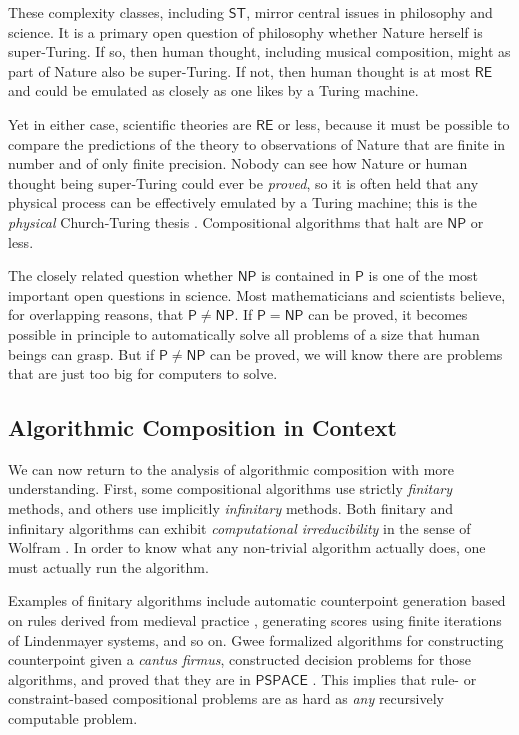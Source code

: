 \documentclass[11pt,papersize=a4]{scrartcl}
\begin{document}
\noindent These complexity classes, including $\mathsf{ST}$, mirror central issues in philosophy and science. It is a primary open question of philosophy whether Nature herself is super-Turing. If so, then human thought, including musical composition, might as part of Nature also be super-Turing. If not, then human thought is at most $\mathsf{RE}$ and could be emulated as closely as one likes by a Turing machine. 

Yet in either case, scientific theories are $\mathsf{RE}$ or less, because it must be possible to compare the predictions of the theory to observations of Nature that are finite in number and of only finite precision. Nobody can see how Nature or human thought being super-Turing could ever be \emph{proved}, so it is often held that any physical process can be effectively emulated by a Turing machine; this is the \emph{physical} Church-Turing thesis \parencite{aaronson2005npcomplete, sep-church-turing}. Compositional algorithms that halt are $\mathsf{NP}$ or less.

The closely related question whether $\mathsf{NP}$ is contained in $\mathsf{P}$ is one of the most important open questions in science. Most mathematicians and scientists believe, for overlapping reasons, that $\mathsf{P} \ne \mathsf{NP}$. If $\mathsf{P} = \mathsf{NP}$  can be proved, it becomes possible in principle to automatically solve all problems of a size that human beings can grasp. But if $\mathsf{P} \ne \mathsf{NP}$ can be proved, we will know there are problems that are just too big for computers to solve.
 
\subsection*{Algorithmic Composition in Context}

We can now return to the analysis of algorithmic composition with more understanding. First, some compositional algorithms use strictly \emph{finitary} methods, and others use implicitly \emph{infinitary} methods. Both finitary and infinitary algorithms can exhibit \emph{computational irreducibility} in the sense of Wolfram \parencite{wolfram1985undecidability}. In order to know what any non-trivial algorithm actually does, one must actually run the algorithm.

Examples of finitary algorithms include automatic counterpoint generation based on rules derived from medieval practice \parencite{schottstaedt1989automatic, taube1991common}, generating scores using finite iterations of Lindenmayer systems, and so on. Gwee formalized algorithms for constructing counterpoint given a \emph{cantus firmus}, constructed decision problems for those algorithms, and proved that they are in $\mathsf{PSPACE}$ \parencite{gwee2002complexity, gwee2013music}. This implies that rule- or constraint-based compositional problems are as hard as \emph{any} recursively computable problem.
\end{document}
